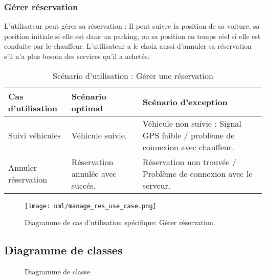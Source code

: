 \subsubsection{Gérer réservation}
L'utilisateur peut gérer sa réservation : Il peut suivre la position de sa voiture, sa position initiale si elle est dans un parking, ou sa position en temps réel si elle est conduite par le chauffeur. L'utilisateur a le choix aussi d'annuler sa réservation s'il n'a plus besoin des services qu'il a achetés.
\begin{table}[H]
    \begin{center}
        \begin{tabularx}{\textwidth} {
                | >{\centering\arraybackslash}X
                | >{\centering\arraybackslash}X
                | >{\centering\arraybackslash}X |}
            \hline
            Cas d'utilisation   & Scénario optimal                 & Scénario d'exception                                                            \\
            \hline
            Suivi véhicules     & Véhicule suivie.                 & Véhicule non suivie : Signal GPS faible / problème de connexion avec chauffeur. \\
            \hline
            Annuler réservation & Réservation annulée avec succés. & Réservation non trouvée / Problème de connexion avec le serveur.                \\
            \hline
        \end{tabularx}
        \captionsetup{justification=centering}
        \caption{Scénario d'utilisation : Gérer une réservation}
        \label{tab:manage_reservation_scenario}
    \end{center}
\end{table}
\begin{figure}[H]
    \centering
    \texttt{[image: uml/manage\_res\_use\_case.png]}
    \vspace{1cm}
    \captionsetup{justification=centering}
    \caption{Diagramme de cas d'utilisation spécifique: Gérer réservation.}
    \label{fig:use_case_manage_res}
\end{figure}
\subsection{Diagramme de classes}
\begin{figure}[H]
    \centering
    \vspace{1cm}
    \captionsetup{justification=centering}

    \caption{Diagramme de classe}
    \label{fig:class_diag}
\end{figure}
\clearpage
